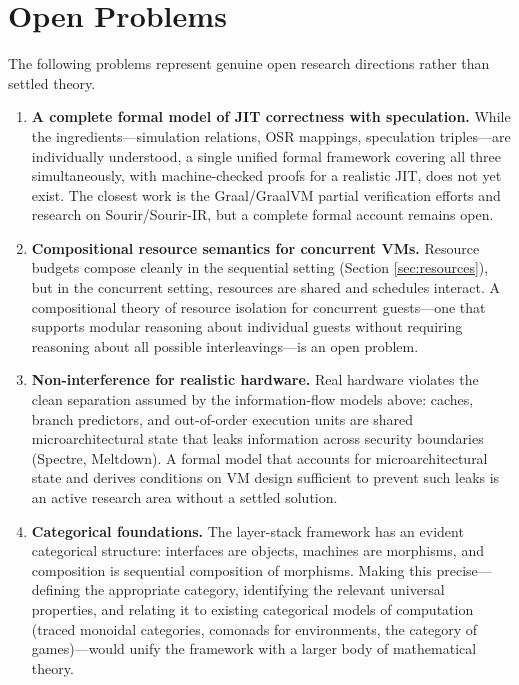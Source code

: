 \documentclass[11pt, a4paper]{article}
\theoremstyle{definition}
\theoremstyle{plain}
\theoremstyle{remark}
\begin{document}
\section{Open Problems}
\label{sec:open}

The following problems represent genuine open research directions rather
than settled theory.

\begin{enumerate}
  \item \textbf{A complete formal model of JIT correctness with speculation.}
        While the ingredients---simulation relations, OSR mappings,
        speculation triples---are individually understood, a single unified
        formal framework covering all three simultaneously, with machine-checked
        proofs for a realistic JIT, does not yet exist. The closest work is
        the Graal/GraalVM partial verification efforts and research on
        Sourir/Sourir-IR, but a complete formal account remains open.

  \item \textbf{Compositional resource semantics for concurrent VMs.}
        Resource budgets compose cleanly in the sequential setting (Section
        \ref{sec:resources}), but in the concurrent setting, resources are
        shared and schedules interact. A compositional theory of resource
        isolation for concurrent guests---one that supports modular
        reasoning about individual guests without requiring reasoning about
        all possible interleavings---is an open problem.

  \item \textbf{Non-interference for realistic hardware.}
        Real hardware violates the clean separation assumed by the
        information-flow models above: caches, branch predictors, and
        out-of-order execution units are shared microarchitectural state
        that leaks information across security boundaries (Spectre, Meltdown).
        A formal model that accounts for microarchitectural state and derives
        conditions on VM design sufficient to prevent such leaks is an active
        research area without a settled solution.

  \item \textbf{Categorical foundations.}
        The layer-stack framework has an evident categorical structure:
        interfaces are objects, machines are morphisms, and composition is
        sequential composition of morphisms. Making this precise---defining
        the appropriate category, identifying the relevant universal
        properties, and relating it to existing categorical models of
        computation (traced monoidal categories, comonads for environments,
        the category of games)---would unify the framework with a larger
        body of mathematical theory.


\end{enumerate}
\end{document}
